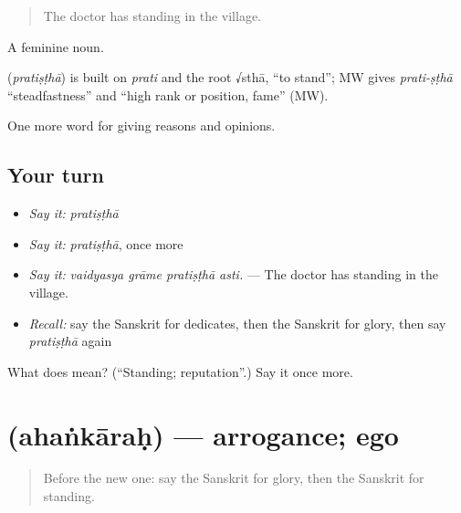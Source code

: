 \begin{quote}
The doctor has standing in the village.
\end{quote}

A feminine noun.

\begin{cousinweb}
\textbf{} (\emph{pratiṣṭhā}) is built on \emph{prati} and the root √sthā, \textquotedblleft{}to stand\textquotedblright{}; MW gives \emph{prati-ṣṭhā} \textquotedblleft{}steadfastness\textquotedblright{} and \textquotedblleft{}high rank or position, fame\textquotedblright{} (MW).
\end{cousinweb}

\begin{grammarlens}[title={What you've built}]
One more word for giving reasons and opinions.
\end{grammarlens}

\subsection*{Your turn}
\begin{itemize}
\raggedright
  \item \emph{Say it:} \emph{pratiṣṭhā}
  \item \emph{Say it:} \emph{pratiṣṭhā}, once more
  \item \emph{Say it:} \emph{vaidyasya grāme pratiṣṭhā asti.} — The doctor has standing in the village.
  \item \emph{Recall:} say the Sanskrit for dedicates, then the Sanskrit for glory, then say \emph{pratiṣṭhā} again
\end{itemize}

\begin{tcolorbox}[breakable,colback=teal!4,colframe=teal!35!black,title={Before you move on}]
What does  mean? (\textquotedblleft{}Standing; reputation\textquotedblright{}.) Say it once more.
\end{tcolorbox}
\section[\texorpdfstring{\sk{अहंकारः} (ahaṅkāraḥ)}{अहंकारः (ahaṅkāraḥ)}]{ (ahaṅkāraḥ) — arrogance; ego}

\label{lesson:SA-C360-ahankarah}



\begin{quote}
Before the new one: say the Sanskrit for glory, then the Sanskrit for standing.
\end{quote}

